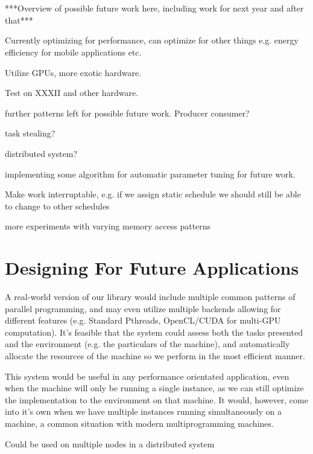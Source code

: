\section{}

***Overview of possible future work here, including work for next year and after that***

Currently optimizing for performance, can  optimize for other things e.g. energy efficiency for mobile applications etc.

Utilize GPUs, more exotic hardware.

Test on XXXII and other hardware.

further patterns left for possible future work. Producer consumer?

task stealing?

distributed system?

implementing some algorithm for automatic parameter tuning for future work.

Make work interruptable, e.g. if we assign static schedule we should still be able to change to other schedules

more experiments with varying memory access patterns

\section{Designing For Future Applications}

A real-world version of our library would include multiple common patterns of parallel programming, and may even utilize multiple backends allowing for different features (e.g. Standard Pthreads, OpenCL/CUDA for multi-GPU computation). It's feasible that the system could assess both the tasks presented and the environment (e.g. the particulars of the machine), and automatically allocate the resources of the machine so we perform in the most efficient manner.

This system would be useful in any performance orientated application, even when the machine will only be running a single instance, as we can still optimize the implementation to the environment on that machine. It would, however, come into it's own when we have multiple instances running simultaneously on a machine, a common situation with modern multiprogramming machines.

Could be used on multiple nodes in a distributed system